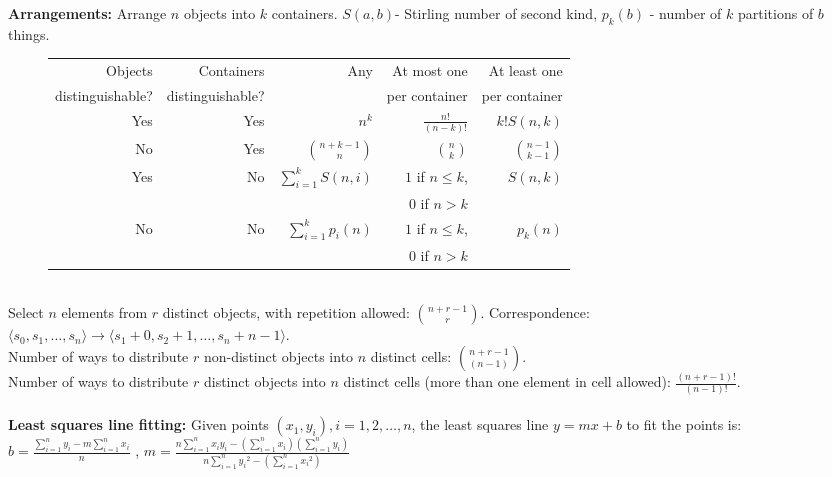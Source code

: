 {\bf Arrangements:}  Arrange $n$ objects into $k$ containers. $S(a,b)$- Stirling number
of second kind, $p_k(b)$ - number of $k$ partitions of $b$ things.
\begin{figure} [h]
\begin{center}
\begin{tabular} {|r|r||r|r|r|}
\hline
Objects & Containers & Any & At most one & At least one \\
distinguishable?& distinguishable?& & per container & per container \\
\hline
Yes & Yes & $n^k$ & ${\frac {n!} {(n-k)!}}$ & $k! S(n,k)$ \\
\hline
No & Yes & ${ {n+k-1} \choose {n}}$ & ${n \choose k}$ & ${{n-1} \choose {k-1}}$\\
\hline
Yes & No & $\sum_{i=1}^k S(n,i)$ & $1$ if $n \le k$, & $S(n,k)$ \\
& & & $0$ if $n > k$ & \\
\hline
No & No & $\sum_{i=1}^k p_i(n)$ & $1$ if $n \le k$, & $p_k(n)$\\
& & & $0$ if $n > k$ & \\
\hline
\end{tabular}
\end{center}
\end{figure}
\\
Select $n$ elements from $r$ distinct objects, with repetition allowed: ${{n+r-1} \choose {r}}$.
Correspondence: $\langle s_0, s_1, \ldots , s_n \rangle \rightarrow \langle s_1+0, s_2+1, \ldots, s_n+n-1 \rangle$.
\\
Number of ways to distribute $r$ non-distinct objects into $n$ distinct cells: ${{n+r-1} \choose {(n-1)}}$.
\\
Number of ways to distribute $r$ distinct objects into $n$ distinct cells (more than one element in cell allowed): 
${\frac {(n+r-1)!} {(n-1)!}}$.
\\
\\
{\bf Least squares line fitting:} Given points 
$(x_1, y_i), i = 1, 2, \ldots, n$, the least squares line $y=mx+b$ to fit the points is:
$b = {\frac {\sum_{i=1}^n y_i - m \sum_{i=1}^n x_i} {n}}$ ,
$m = {\frac {n \sum_{i=1}^n x_i y_i -  (\sum_{i=1}^n x_i) (\sum_{i=1}^n y_i)}
{n \sum_{i=1}^n {y_i}^2 -  (\sum_{i=1}^n {x_i}^2)}}$ 

